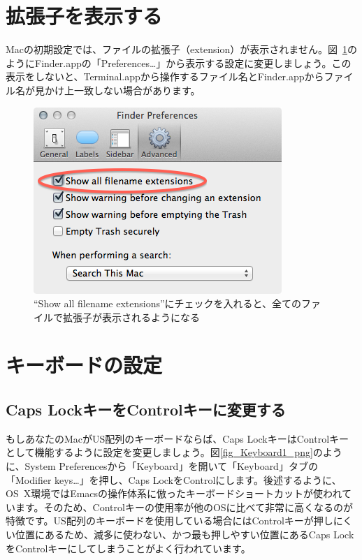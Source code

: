 \section{拡張子を表示する}
Macの初期設定では、ファイルの拡張子（extension）が表示されません。図~\ref{fig_Extension_png}のようにFinder.appの「Preferences\ldots」から表示する設定に変更しましょう。この表示をしないと、Terminal.appから操作するファイル名とFinder.appからファイル名が見かけ上一致しない場合があります。

\begin{figure}
  \begin{center}
    \includegraphics[scale=0.4,bb= 0 0 355 267]{fig/Extension.png}
    \caption{``Show all filename extensions''にチェックを入れると、全てのファイルで拡張子が表示されるようになる}
    \label{fig_Extension_png}
  \end{center}
\end{figure}

\section{キーボードの設定}

\subsection{Caps LockキーをControlキーに変更する}
もしあなたのMacがUS配列のキーボードならば、Caps LockキーはControlキーとして機能するように設定を変更しましょう。図\ref{fig_Keyboard1_png}のように、System Preferencesから「Keyboard」を開いて「Keyboard」タブの「Modifier keys\ldots」を押し、Caps LockをControlにします。後述するように、OS~X環境ではEmacsの操作体系に倣ったキーボードショートカットが使われています。そのため、Controlキーの使用率が他のOSに比べて非常に高くなるのが特徴です。US配列のキーボードを使用している場合にはControlキーが押しにくい位置にあるため、滅多に使わない、かつ最も押しやすい位置にあるCaps LockをControlキーにしてしまうことがよく行われています。

